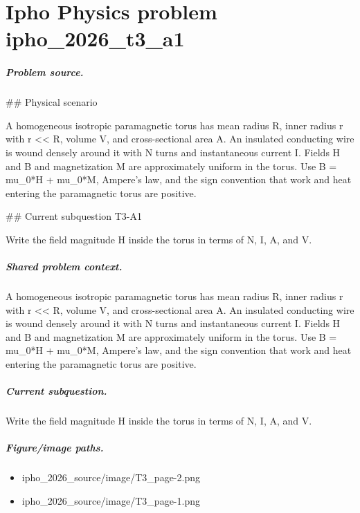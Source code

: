 
\chapter{Ipho Physics problem ipho\_2026\_t3\_a1}
\label{ch:IPhO2026Problems_problem_ipho_2026_t3_a1}

\paragraph{Problem source.}
\#\# Physical scenario

A homogeneous isotropic paramagnetic torus has mean radius R, inner radius r
with r << R, volume V, and cross-sectional area A.  An insulated conducting
wire is wound densely around it with N turns and instantaneous current I.
Fields H and B and magnetization M are approximately uniform in the torus.
Use B = mu\_0*H + mu\_0*M, Ampere's law, and the sign convention that work and
heat entering the paramagnetic torus are positive.

\#\# Current subquestion T3-A1

Write the field magnitude H inside the torus in terms of N, I, A, and V.

\paragraph{Shared problem context.}
A homogeneous isotropic paramagnetic torus has mean radius R, inner radius r
with r << R, volume V, and cross-sectional area A.  An insulated conducting
wire is wound densely around it with N turns and instantaneous current I.
Fields H and B and magnetization M are approximately uniform in the torus.
Use B = mu\_0*H + mu\_0*M, Ampere's law, and the sign convention that work and
heat entering the paramagnetic torus are positive.

\paragraph{Current subquestion.}
Write the field magnitude H inside the torus in terms of N, I, A, and V.

\paragraph{Figure/image paths.}
\begin{itemize}
\item ipho\_2026\_source/image/T3\_page-2.png
\item ipho\_2026\_source/image/T3\_page-1.png
\end{itemize}

